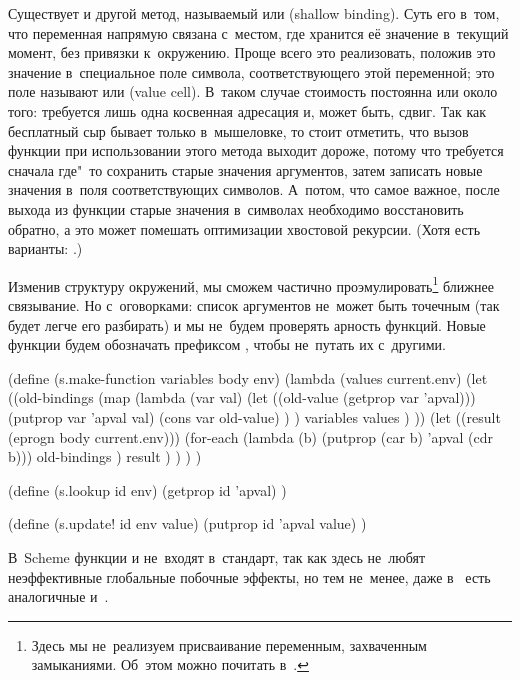 Существует и другой метод, называемый  или  (shallow binding). Суть его в~том, что переменная напрямую связана
с~местом, где хранится её значение в~текущий момент, без привязки к~окружению.
Проще всего это реализовать, положив это значение в~специальное поле символа,
соответствующего этой переменной; это поле называют  или  (value cell). В~таком случае стоимость  постоянна или около
того: требуется лишь одна косвенная адресация и, может быть, сдвиг. Так как
бесплатный сыр бывает только в~мышеловке, то стоит отметить, что вызов функции
при использовании этого метода выходит дороже, потому что требуется сначала
где"~то сохранить старые значения аргументов, затем записать новые значения
в~поля соответствующих символов. А~потом, что самое важное, после выхода из
функции старые значения в~символах необходимо восстановить обратно, а это может
помешать оптимизации хвостовой рекурсии. (Хотя есть варианты: \cite{sj93}.)

Изменив структуру окружений, мы сможем частично проэмулировать\footnote{Здесь мы
не~реализуем присваивание переменным, захваченным замыканиями. Об~этом можно
почитать в~\cite{bcsj86}.} ближнее связывание. Но с~оговорками: список
аргументов не~может быть точечным (так будет легче его разбирать) и мы не~будем
проверять арность функций. Новые функции будем обозначать префиксом ,
чтобы не~путать их с~другими.

\begin{code:lisp}
(define (s.make-function variables body env)
  (lambda (values current.env)
    (let ((old-bindings
           (map (lambda (var val)
                  (let ((old-value (getprop var 'apval)))
                    (putprop var 'apval val)
                    (cons var old-value) ) )
                variables
                values ) ))
      (let ((result (eprogn body current.env)))
        (for-each (lambda (b) (putprop (car b) 'apval (cdr b)))
                  old-bindings )
        result ) ) ) )

(define (s.lookup id env)
  (getprop id 'apval) )

(define (s.update! id env value)
  (putprop id 'apval value) )
\end{code:lisp}

В~Scheme функции  и  не~входят в~стандарт, так как здесь
не~любят неэффективные глобальные побочные эффекты, но тем не~менее, даже
в~\cite{as85} есть аналогичные  и~.

